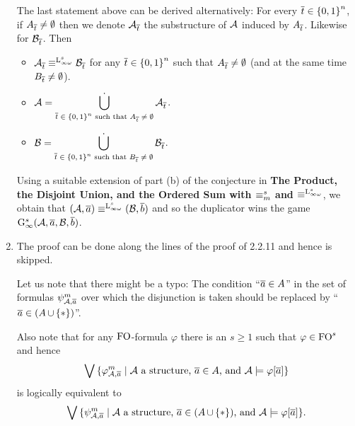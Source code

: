 \begin{enumerate}[1.]
\begin{remark}
The last statement above can be derived alternatively: For every $\overline{t} \in {\{0, 1\}}^{n}$, if $A_{\overline{t}} \neq \emptyset$ then we denote $\mathcal{A}_{\overline{t}}$ the substructure of $\mathcal{A}$ induced by $A_{\overline{t}}$. Likewise for $\mathcal{B}_{\overline{t}}$. Then
\begin{itemize}
\item $\strct{A}_{\vect{t}} \equv^{\inflog[s]} \strct{B}_{\vect{t}}$ for any $\overline{t} \in {\{0, 1\}}^{n}$ such that $A_{\overline{t}} \neq \emptyset$ (and at the same time $B_{\overline{t}} \neq \emptyset$).
\item $\ds{\strct{A} = \bdunion_{\mbox{\scriptsize\mathmode{\vect{t} \in \cartpwr{\sete{0, 1}}{n}} such that \mathmode{A_{\vect{t}} \neq \emptyset}}} \strct{A}_{\vect{t}}}$.
\item $\ds{\strct{B} = \bdunion_{\mbox{\scriptsize\mathmode{\vect{t} \in \cartpwr{\sete{0, 1}}{n}} such that \mathmode{B_{\vect{t}} \neq \emptyset}}} \strct{B}_{\vect{t}}}$.
\end{itemize}
Using a suitable extension of part (b) of the conjecture in \textbf{The Product, the Disjoint Union, and the Ordered Sum with $\equiv^s_m$ and $\equv^{\inflog[s]}$}, we obtain that $(\strct{A}, \vect{a}) \equv^{\inflog[s]} (\strct{B}, \vect{b})$ and so the duplicator wins the game $\game[s]{\infty}(\strct{A}, \vect{a}, \strct{B}, \vect{b})$.
\end{remark}
%
\item {} The proof can be done along the lines of the proof of 2.2.11 and hence is skipped.

Let us note that there might be a typo: The condition ``$\overline{a} \in A$'' in the set of formulas $\ityp{m}{\strct{A}, \vect{a}}$ over which the disjunction is taken should be replaced by ``$\overline{a} \in (A \mathop{\cup} {\{\ast\}})$''.

Also note that for any $\folog$-formula $\varphi$ there is an $s \geq 1$ such that $\varphi \in \folog^s$ and hence
\[
\blor \sett{\hint{m}{\strct{A}, \vect{a}}}{\mathmode{\strct{A}} a structure, \mathmode{\vect{a} \in A}, and \mathmode{\strct{A} \satis \varphi[\vect{a}]}}
\]
is logically equivalent to
\[
\blor \sett{\ityp{m}{\strct{A}, \vect{a}}}{\mathmode{\strct{A}} a structure, \mathmode{\vect{a} \in (A \union \sete{\off})}, and \mathmode{\strct{A} \satis \varphi[\vect{a}]}}.
\]
%
\end{enumerate}
